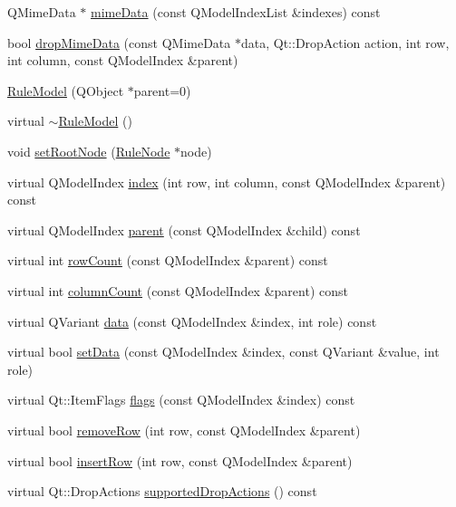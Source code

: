 \begin{DoxyCompactItemize}
\item 
QMimeData $\ast$ \hyperlink{class_rule_model_acb63ebf826171b4fe16f6983f9e87f9e}{mimeData} (const QModelIndexList \&indexes) const 
\item 
bool \hyperlink{class_rule_model_aef085bed1b61272c4c6fa2e9a827a3ff}{dropMimeData} (const QMimeData $\ast$data, Qt::DropAction action, int row, int column, const QModelIndex \&parent)
\item 
\hyperlink{class_rule_model_a17fb8fdd3719bc5ecdeb995fc847cd11}{RuleModel} (QObject $\ast$parent=0)
\item 
virtual \hyperlink{class_rule_model_a6a4dc893d7529d0188f08e12197debcd}{$\sim$RuleModel} ()
\item 
void \hyperlink{class_rule_model_a8dc7ad7cea1f50b46904f0ea18e69915}{setRootNode} (\hyperlink{class_rule_node}{RuleNode} $\ast$node)
\item 
virtual QModelIndex \hyperlink{class_rule_model_abd5b377720c8ba6f1a5a2187b886ac03}{index} (int row, int column, const QModelIndex \&parent) const 
\item 
virtual QModelIndex \hyperlink{class_rule_model_af6bc9ab08f1177f934d9685fdf8a89dc}{parent} (const QModelIndex \&child) const 
\item 
virtual int \hyperlink{class_rule_model_a0f8898afc4520e31447730bc8a93ee11}{rowCount} (const QModelIndex \&parent) const 
\item 
virtual int \hyperlink{class_rule_model_a2bcde918444fbab561546abb092e2c7e}{columnCount} (const QModelIndex \&parent) const 
\item 
virtual QVariant \hyperlink{class_rule_model_aa773595af0d03a6c85b9a0987b5a261b}{data} (const QModelIndex \&index, int role) const 
\item 
virtual bool \hyperlink{class_rule_model_a5c076e15e9f11eeb88357a621888230b}{setData} (const QModelIndex \&index, const QVariant \&value, int role)
\item 
virtual Qt::ItemFlags \hyperlink{class_rule_model_aa0ff4a1bde62f5227c8e0e58347aa2b0}{flags} (const QModelIndex \&index) const 
\item 
virtual bool \hyperlink{class_rule_model_ad46545c357dd1fdcef9b98289ec28a92}{removeRow} (int row, const QModelIndex \&parent)
\item 
virtual bool \hyperlink{class_rule_model_a266833355d565b186c06a2518bb00371}{insertRow} (int row, const QModelIndex \&parent)
\item 
virtual Qt::DropActions \hyperlink{class_rule_model_a45a1cb7727d8522ce5117ca33e0a1cce}{supportedDropActions} () const 

\end{DoxyCompactItemize}
